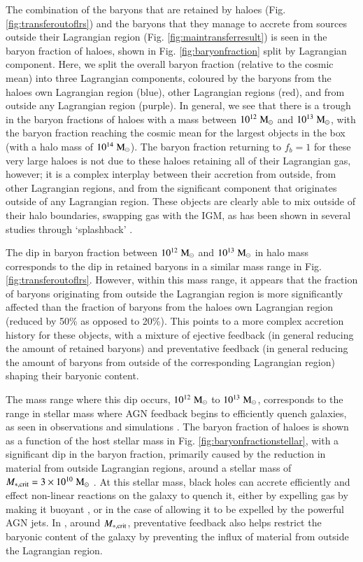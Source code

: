 The combination of the baryons that are retained by haloes (Fig.
\ref{fig:transferoutoflrs}) and the baryons that they manage to accrete from
sources outside their Lagrangian region (Fig. \ref{fig:maintransferresult})
is seen in the baryon fraction of haloes, shown in Fig.
\ref{fig:baryonfraction} split by Lagrangian component. Here, we split the
overall baryon fraction (relative to the cosmic mean) into three Lagrangian
components, coloured by the baryons from the haloes own Lagrangian region
(blue), other Lagrangian regions (red), and from outside any Lagrangian
region (purple). In general, we see that there is a trough in the baryon
fractions of haloes with a mass between $10^{12}\msolar{}$ and
$10^{13}\;{\rm M}_{\odot}{}$, with the baryon fraction reaching the cosmic mean for the
largest objects in the box (with a halo mass of $10^{14}\;{\rm M}_{\odot}{}$). The
baryon fraction returning to $f_b = 1$ for these very large haloes is not due
to these haloes retaining all of their Lagrangian gas, however; it is a
complex interplay between their accretion from outside, from other Lagrangian
regions, and from the significant component that originates outside of any
Lagrangian region. These objects are clearly able to mix outside of their
halo boundaries, swapping gas with the IGM, as has been shown in several
studies through `splashback' \citep{Mansfield2017, Diemer2017}.

The dip in baryon fraction between $10^{12}\msolar{}$ and $10^{13}\;{\rm M}_{\odot}{}$ in halo
mass corresponds to the dip in retained baryons in a similar mass range in
Fig. \ref{fig:transferoutoflrs}. However, within this mass range, it appears
that the fraction of baryons originating from outside the Lagrangian region is
more significantly affected than the fraction of baryons from the haloes own
Lagrangian region (reduced by 50\% as opposed to 20\%). This points
to a more complex accretion history for these objects, with a mixture of
ejective feedback (in general reducing the amount of retained baryons) and preventative
feedback (in general reducing the amount of baryons from outside of the
corresponding Lagrangian region) shaping their baryonic content.

The mass range where this dip occurs, $10^{12}\msolar{}$ to
$10^{13}\;{\rm M}_{\odot}{}$, corresponds to the range in stellar mass
\citep[$10^{11}\msolar{}$ to $10^{12}\msolar{}$,][]{Moster2013} where AGN
feedback begins to efficiently quench galaxies, as seen in observations
\citep{Kauffmann2003} and simulations \citep{Bower2017, Taylor2017}. The
baryon fraction of haloes is shown as a function of the host stellar mass in
Fig. \ref{fig:baryonfractionstellar}, with a significant dip in the baryon
fraction, primarily caused by the reduction in material from outside
Lagrangian regions, around a stellar mass of $M_{*, {\rm crit}} =
3\times10^{10} \;{\rm M}_{\odot}{}$ \citep{Kauffmann2003}. At this stellar mass, black
holes can accrete efficiently and effect non-linear reactions on the galaxy
to quench it, either by expelling gas by making it buoyant \citep{Bower2017},
or in the case of \simba{} allowing it to be expelled by the powerful AGN
jets. In \simba{}, around $M_{*, {\rm crit}}$, preventative feedback also
helps restrict the baryonic content of the galaxy by preventing the influx of
material from outside the Lagrangian region.


